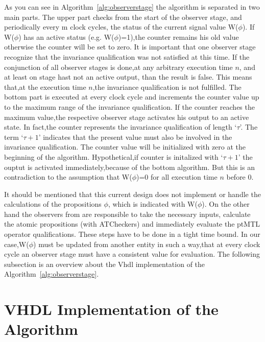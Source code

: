 As you can see in Algorithm~\ref{alg:observerstage} the algorithm is separated in two main parts. 
The upper part checks from the start of the observer stage, and periodically every m clock cycles,
the status of the current signal value W($\phi$). If W($\phi$) has an active status (e.g. W($\phi$)=1),the counter remains his old value otherwise the counter will be set to zero.
It is important that one observer stage recognize that the invariance qualification was not satisfied
at this time. If the conjunction of all observer stages is done,at any arbitrary execution time $n$, and at least on stage hast not an active output,
than the result is false. This means that,at the execution time $n$,the invariance qualification is not fulfilled.
The bottom part is executed at every clock cycle and increments the counter value up to the maximum range of the invariance qualification.
If the counter reaches the maximum value,the respective observer stage activates his output to an active state. In fact,the counter represents the invariance qualification of length
`$\tau$'. The term `$\tau + 1$' indicates that the present value must also be involved in the invariance qualification.
The counter value will be initialized with zero at the beginning of the algorithm. Hypothetical,if counter is initalized with `$\tau + 1$' the ouptut is activated immediately,because
of the bottom algorithm. But this is an contradiction to the assumption that  W($\phi$)=0 for all execution time $n$ before 0.

It should be mentioned that this current design does not implement or handle the calculations of the propositions $\phi$, 
which is indicated with W($\phi$). On the other hand the observers from \cite{RTFMBJ13} are responsible to take the necessary inputs,
calculate the atomic propositions (with ATCheckers) and immediately evaluate the ptMTL operator qualifications.
These steps have to be done in a tight time bound.
In our case,W($\phi$) must be updated from another entity in such a way,that at every clock cycle an observer stage must have a consistent value for evaluation.
The following subsection is an overview about the Vhdl implementation of the Algorithm~\ref{alg:observerstage}.
\section{VHDL Implementation of the Algorithm}  

